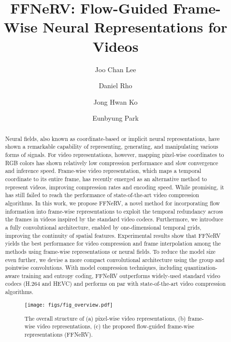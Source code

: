 \documentclass[sigconf]{acmart}
\begin{document}
\title{FFNeRV: Flow-Guided Frame-Wise Neural Representations for Videos}

\author{Joo Chan Lee}

\author{Daniel Rho}

\author{Jong Hwan Ko}

\author{Eunbyung Park}
\authornotemark[1]


\renewcommand{\shortauthors}{Lee et al.}

\begin{abstract}
Neural fields, also known as coordinate-based or implicit neural representations, have shown a remarkable capability of representing, generating, and manipulating various forms of signals. For video representations, however, mapping pixel-wise coordinates to RGB colors has shown relatively low compression performance and slow convergence and inference speed. Frame-wise video representation, which maps a temporal coordinate to its entire frame, has recently emerged as an alternative method to represent videos, improving compression rates and encoding speed. While promising, it has still failed to reach the performance of state-of-the-art video compression algorithms. In this work, we propose FFNeRV, a novel method for incorporating flow information into frame-wise representations to exploit the temporal redundancy across the frames in videos inspired by the standard video codecs. Furthermore, we introduce a fully convolutional architecture, enabled by one-dimensional temporal grids, improving the continuity of spatial features. Experimental results show that FFNeRV yields the best performance for video compression and frame interpolation among the methods using frame-wise representations or neural fields. To reduce the model size even further, we devise a more compact convolutional architecture using the group and pointwise convolutions. With model compression techniques, including quantization-aware training and entropy coding, FFNeRV outperforms widely-used standard video codecs (H.264 and HEVC) and performs on par with state-of-the-art video compression algorithms.
\let\thefootnote\relax{}
\begin{figure}[t]
\centering
\texttt{[image: figs/fig\_overview.pdf]}
   \caption{The overall structure of (a) pixel-wise video representations, (b) frame-wise video representations, (c) the proposed flow-guided frame-wise representations (FFNeRV).}
\label{fig_overview}
\end{figure}
\end{abstract}
\end{document}
